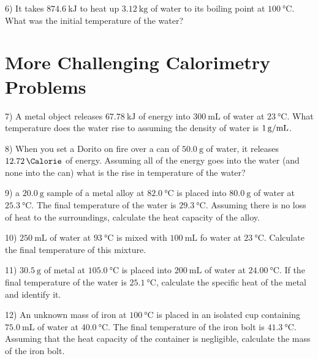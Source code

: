 \documentclass[12pt, oneside, letterpaper]{book}
\begin{document}
6) It takes $\qty{874.6}{\kilo\joule}$ to heat up $\qty{3.12}{\kilo\gram}$ of water to its boiling point at $\qty{100}{\degreeCelsius}$. What was the initial temperature of the water?

\newpage

\section{More Challenging Calorimetry Problems}
7) A metal object releases $\qty{67.78}{\kilo\joule}$ of energy into $\qty{300} {\mL}$ of water at $\qty{23} {\degreeCelsius}$. What temperature does the water rise to assuming the density of water is $\qty[per-mode=fraction]{1}{\gram\per{\milli\liter}}$.

8) When you set a Dorito on fire over a can of $\qty{50.0} {\gram}$ of water, it releases $\qty{12.72}{\Calorie}$ of energy. Assuming all of the energy goes into the water (and none into the can) what is the rise in temperature of the water?

9) a $\qty{20.0}{\gram}$ sample of a metal alloy at $\qty{82.0}{\degreeCelsius}$ is placed into $\qty{80.0}{\gram}$ of water at $\qty{25.3}{\degreeCelsius}$. The final temperature of the water is $\qty{29.3}{\degreeCelsius}$. Assuming there is no loss of heat to the surroundings, calculate the heat capacity of the alloy.

10) $\qty{250}{\mL}$ of water at $\qty{93}{\degreeCelsius}$ is mixed with $\qty{100}{\mL}$ fo water at $\qty{23} {\degreeCelsius}$. Calculate the final temperature of this mixture.

11) $\qty{30.5}{\gram}$ of metal at $\qty{105.0}{\degreeCelsius}$ is placed into $\qty{200}{\mL}$ of water at $\qty{24.00} {\degreeCelsius}$. If the final temperature of the water is $\qty{25.1}{\degreeCelsius}$, calculate the specific heat of the metal and identify it.

12) An unknown mass of iron at $\qty{100}{\degreeCelsius}$ is placed in an isolated cup containing $\qty{75.0}{\mL}$ of water at $\qty{40.0}{\degreeCelsius}$. The final temperature of the iron bolt is $\qty{41.3}{\degreeCelsius}$. Assuming that the heat capacity of the container is negligible, calculate the mass of the iron bolt.
\end{document}
